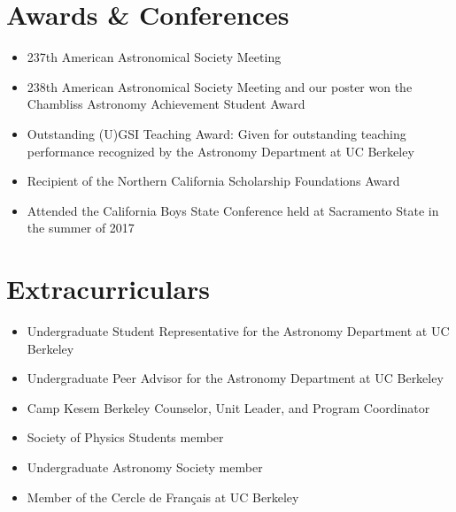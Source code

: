 \documentclass[letterpaper,10pt]{article}
\newcommand{\resumeSubHeadingListStart}{\begin{itemize}[leftmargin=*]}
\newcommand{\resumeSubHeadingListEnd}{\end{itemize}}
\newcommand{\shorterSection}[1]{\vspace{-10pt}\section{#1}}
\begin{document}
 


\shorterSection{Awards \& Conferences}
  \resumeSubHeadingListStart
  \small
    \item{237th American Astronomical Society Meeting}
    \vspace{-3pt}
    \item{238th American Astronomical Society Meeting and our poster won the Chambliss Astronomy Achievement Student Award}
    \vspace{-3pt}
    \item{Outstanding (U)GSI Teaching Award: Given for outstanding teaching performance recognized by the Astronomy Department at UC Berkeley}
    \vspace{-3pt}
    \item{Recipient of the Northern California Scholarship Foundations Award}
    \vspace{-3pt}
    \item{Attended the California Boys State Conference held at Sacramento State in the summer of 2017}
    
    
  \resumeSubHeadingListEnd

\shorterSection{Extracurriculars}
  \resumeSubHeadingListStart
  \small
    \item{Undergraduate Student Representative for the Astronomy Department at UC Berkeley}
    \vspace{-3pt}
    \item{Undergraduate Peer Advisor for the Astronomy Department at UC Berkeley}
    \vspace{-3pt}
    \item{Camp Kesem Berkeley Counselor, Unit Leader, and Program Coordinator}
    \vspace{-3pt}
    \item{Society of Physics Students member}
    \vspace{-3pt}
    \item{Undergraduate Astronomy Society member}
    \vspace{-3pt}
    \item{Member of the Cercle de Français at UC Berkeley}
  \resumeSubHeadingListEnd
  
\end{document}
